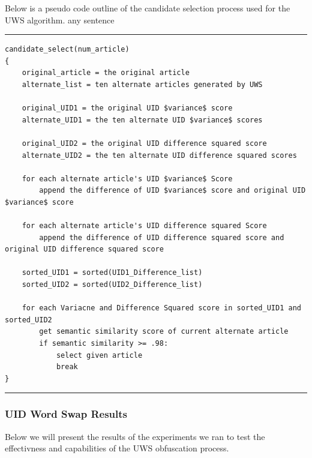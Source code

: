 \documentclass{article}
\begin{document}
Below is a pseudo code outline of the candidate selection process used for the UWS algorithm. 
\hypertarget{pseudo}{any sentence}
\newline
\noindent\rule{12cm}{0.4pt}
\begin{verbatim}
candidate_select(num_article)
{
    original_article = the original article
    alternate_list = ten alternate articles generated by UWS 
    
    original_UID1 = the original UID $variance$ score
    alternate_UID1 = the ten alternate UID $variance$ scores
    
    original_UID2 = the original UID difference squared score
    alternate_UID2 = the ten alternate UID difference squared scores
    
    for each alternate article's UID $variance$ Score
        append the difference of UID $variance$ score and original UID $variance$ score
            
    for each alternate article's UID difference squared Score
        append the difference of UID difference squared score and original UID difference squared score
        
    sorted_UID1 = sorted(UID1_Difference_list)
    sorted_UID2 = sorted(UID2_Difference_list)
    
    for each Variacne and Difference Squared score in sorted_UID1 and sorted_UID2
        get semantic similarity score of current alternate article
        if semantic similarity >= .98:
            select given article
            break
}
\end{verbatim}

\noindent\rule{12cm}{0.4pt}

\subsubsection{UID Word Swap Results}
Below we will present the results of the experiments we ran to test the effectivness and capabilities of the UWS obfuscation process.
\end{document}
